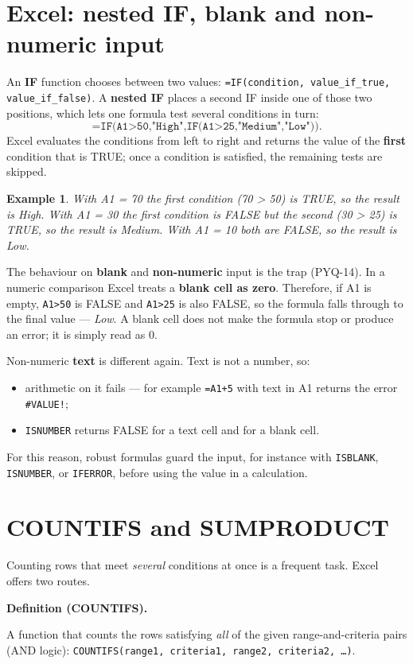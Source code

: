 \documentclass[11pt]{article}
\newtheorem{example}{Example}[section]
\newenvironment{definitionbox}[1]{%
  \par\noindent\textbf{Definition (#1).}\ \itshape
}{\par\vspace{0.3em}}
\begin{document}
\section{Excel: nested IF, blank and non-numeric input}
An \textbf{IF} function chooses between two values:
\texttt{=IF(condition, value\_if\_true, value\_if\_false)}. A \textbf{nested
IF} places a second IF inside one of those two positions, which lets one
formula test several conditions in turn:
\[
\texttt{=IF(A1>50,"High",IF(A1>25,"Medium","Low"))}.
\]
Excel evaluates the conditions from left to right and returns the value of the
\textbf{first} condition that is TRUE; once a condition is satisfied, the
remaining tests are skipped.

\begin{example}
With A1 = 70 the first condition (70 > 50) is TRUE, so the result is
\emph{High}. With A1 = 30 the first condition is FALSE but the second
(30 > 25) is TRUE, so the result is \emph{Medium}. With A1 = 10 both are
FALSE, so the result is \emph{Low}.
\end{example}

The behaviour on \textbf{blank} and \textbf{non-numeric} input is the trap
(PYQ-14). In a numeric comparison Excel treats a \textbf{blank cell as zero}.
Therefore, if A1 is empty, \texttt{A1>50} is FALSE and
\texttt{A1>25} is also FALSE, so the formula falls through to the final value
--- \emph{Low}. A blank cell does not make the formula stop or produce an
error; it is simply read as 0.

Non-numeric \textbf{text} is different again. Text is not a number, so:
\begin{itemize}
  \item arithmetic on it fails --- for example \texttt{=A1+5} with text in A1
    returns the error \texttt{\#VALUE!};
  \item \texttt{ISNUMBER} returns FALSE for a text cell and for a blank cell.
\end{itemize}
For this reason, robust formulas guard the input, for instance with
\texttt{ISBLANK}, \texttt{ISNUMBER}, or \texttt{IFERROR}, before using the
value in a calculation.

\section{COUNTIFS and SUMPRODUCT}
Counting rows that meet \emph{several} conditions at once is a frequent task.
Excel offers two routes.

\begin{definitionbox}{COUNTIFS}
A function that counts the rows satisfying \emph{all} of the given
range-and-criteria pairs (AND logic):
\texttt{COUNTIFS(range1, criteria1, range2, criteria2, \ldots)}.
\end{definitionbox}
\end{document}
